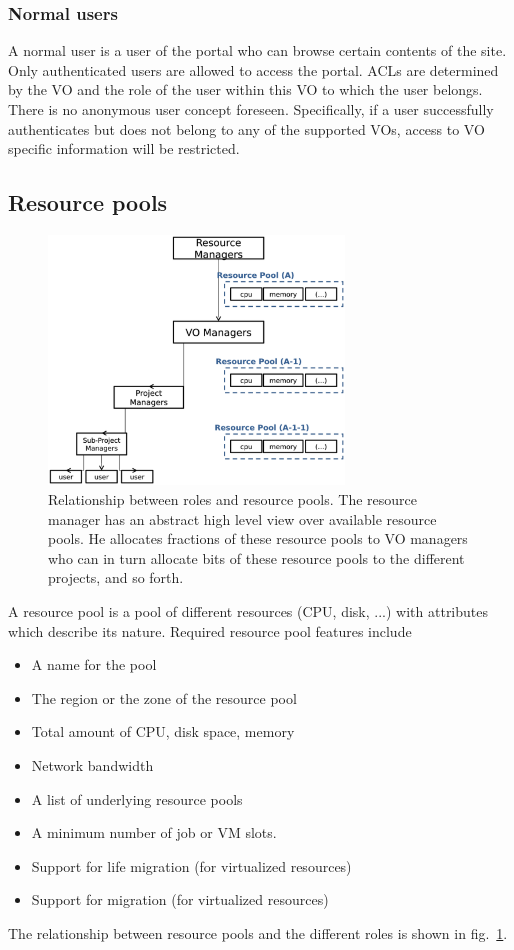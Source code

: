 \documentclass[12pt]{article}
\begin{document}
\subsubsection{Normal users}
A normal user is a user of the portal who can browse certain contents of the site. Only authenticated users are allowed to access the portal. ACLs are determined by the VO and the role of the user within this VO to which the user belongs. There is no anonymous user concept foreseen. 
Specifically, if a user successfully authenticates but does not belong to any of the supported VOs, access to VO specific information will be restricted.

\subsection{Resource pools}
\begin{figure}
\begin{center}
\includegraphics[width=0.7\textwidth]{roles.eps}
\caption{\label{roles} Relationship between roles and resource pools. The resource manager has an abstract high level view over available resource pools. He allocates fractions of these resource pools to VO managers who can in turn allocate bits of these resource pools to the different projects, and so forth. 
}
\end{center}
\end{figure}
A resource pool is a pool of different resources (CPU, disk, ...) with attributes which describe its nature. Required resource pool features include 
\begin{itemize}
\item A name for the pool
\item The region or the zone of the resource pool
\item Total amount of CPU, disk space,  memory
\item Network bandwidth
\item A list of underlying resource pools
\item A minimum number of job or VM slots. 
\item Support for life migration (for virtualized resources)
\item Support for migration (for virtualized resources)
\end{itemize}
The relationship between resource pools and the different roles is shown in fig.~\ref{roles}.
\end{document}
